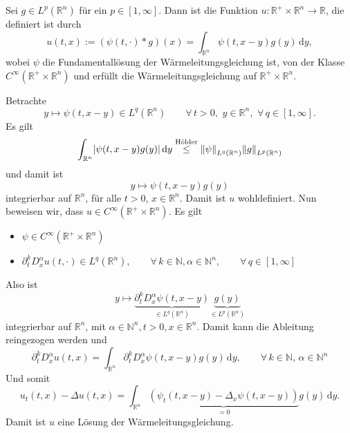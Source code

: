 \begin{satz}
	Sei $g \in L^p(\mathbb{R}^n)$ für ein $p \in [1, \infty]$. Dann ist die Funktion $u: \mathbb{R}^{+} \times \mathbb{R}^n \to \mathbb{R}$, die definiert ist durch
	\[
		u(t,x) := (\psi(t,\cdot)*g)(x) = \int_{\mathbb{R}^n}^{} \psi(t,x-y)g(y) \,\mathrm{d}y, 
	\]
	wobei $\psi$ die Fundamentallösung der Wärmeleitungsgleichung ist, von der Klasse \\ $C^{\infty}(\mathbb{R}^{+} \times \mathbb{R}^n)$ und erfüllt die Wärmeleitungsgleichung auf $\mathbb{R}^{+}\times \mathbb{R}^n$.
\end{satz}
\begin{beweis}
	Betrachte
	\[
		y \mapsto \psi(t,x-y) \in L^q(\mathbb{R}^n) \qquad \forall\, t>0,\,\, y \in \mathbb{R}^n, \,\, \forall\, q \in [1,\infty].	
	\]
	Es gilt
	\[
		\int_{\mathbb{R}^n}^{} \abs{ \psi(t,x-y)g(y)} \,\mathrm{d}y \stackrel{\text{Hölder}}{\leq} \norm{\psi}_{L^q(\mathbb{R}^n)} \norm{g}_{L^p(\mathbb{R}^n)}
	\]
	und damit ist
	\[
		y \mapsto \psi(t,x-y)g(y)
	\]
	integrierbar auf $\mathbb{R}^n$, für alle $t>0$, $x \in \mathbb{R}^n$. Damit ist $u$ wohldefiniert. Nun beweisen wir, dass $u \in C^{\infty}(\mathbb{R}^{+} \times \mathbb{R}^n)$. Es gilt
	\begin{itemize}
		\item $\psi \in C^{\infty}(\mathbb{R}^+ \times \mathbb{R}^n)$
		\item $\partial_t^k D_x^{\alpha}u(t,\cdot) \in L^q(\mathbb{R}^n), \qquad \forall\,  k \in \mathbb{N}, \alpha \in \mathbb{N}^n, \qquad \forall\,  q \in [1,\infty]$
	\end{itemize}
	Also ist
	\[
		y \mapsto \underset{\in L^q(\mathbb{R}^n)}{\underbrace{\partial_t^k D^{\alpha}_x \psi(t,x-y) }}\underset{\in L^p(\mathbb{R}^n)}{\underbrace{g(y)}}
	\]
	integrierbar auf $\mathbb{R}^n$, mit $\alpha \in \mathbb{N}^n, t>0, x \in \mathbb{R}^n$. Damit kann die Ableitung reingezogen werden und
	\[
		\partial_t^k D_x^{\alpha} u(t,x) = \int_{\mathbb{R}^n}^{} \partial_t^k D_x^{\alpha} \psi(t,x-y)g(y) \,\mathrm{d}y,
		\qquad \forall\, k \in \mathbb{N},\, \alpha \in \mathbb{N}^n
	\]
	Und somit
	\[
		u_t(t,x) - \Delta u(t,x) = \int_{\mathbb{R}^n}^{} \underset{=0}{\underbrace{(\psi_t(t,x-y) - \Delta_x \psi(t,x-y))}}g(y) \,\mathrm{d}y.
	\]
	Damit ist $u$ eine Lösung der Wärmeleitungsgleichung.
\end{beweis}

